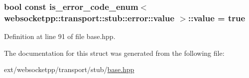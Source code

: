 \subsubsection[{value}]{\setlength{\rightskip}{0pt plus 5cm}bool const is\+\_\+error\+\_\+code\+\_\+enum$<$ {\bf websocketpp\+::transport\+::stub\+::error\+::value} $>$\+::value = true\hspace{0.3cm}{\ttfamily [static]}}\label{structis__error__code__enum_3_01websocketpp_1_1transport_1_1stub_1_1error_1_1value_01_4_a48ac59af9c03585ba1f1f7b8e83a45ee}


Definition at line 91 of file base.\+hpp.



The documentation for this struct was generated from the following file\+:\begin{DoxyCompactItemize}
\item 
ext/websocketpp/transport/stub/\hyperlink{transport_2stub_2base_8hpp}{base.\+hpp}\end{DoxyCompactItemize}
